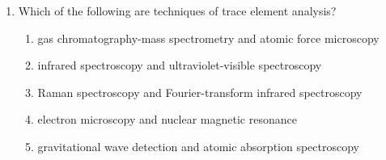 \documentclass[12pt]{article}
\begin{document}
\begin{enumerate}[label=\arabic*.]
\begin{enumerate}[label=(\alph*)]
    \item Backed blade; microlith blade
    \item Iberomaurusian culture; Capsian culture
    \item Natufian; Iberomaurusian culture
    \item Capsian culture; microlith blade
\end{enumerate}
\item Which of the following are techniques of trace element analysis?
\begin{enumerate}[label=(\alph*)]
    \item gas chromatography-mass spectrometry and atomic force microscopy
    \item infrared spectroscopy and ultraviolet-visible spectroscopy
    \item Raman spectroscopy and Fourier-transform infrared spectroscopy
    \item electron microscopy and nuclear magnetic resonance
    \item gravitational wave detection and atomic absorption spectroscopy
\end{enumerate}
\end{enumerate}
\end{document}
